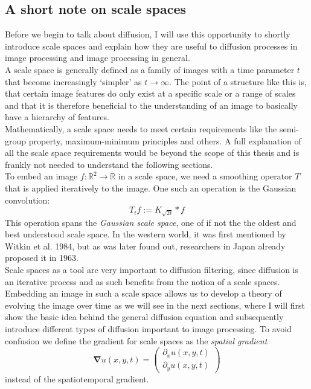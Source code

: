 \subsection{A short note on scale spaces}
Before we begin to talk about diffusion, I will use this opportunity to shortly introduce scale
spaces and explain how they are useful to diffusion processes in image processing and image
processing in general.\\
A scale space is generally defined as a family of images with a time parameter $t$ that become
increasingly `simpler' as $t \to \infty$. The point of a structure like this is, that certain image
features do only exist at a specific scale or a range of scales and that it is therefore beneficial
to the understanding of an image to basically have a hierarchy of features.\\
Mathematically, a scale
space needs to meet certain requirements like the semi-group property, maximum-minimum principles
and others.
A full explanation of all the scale space requirements would be beyond the scope of this thesis
and is frankly not needed to understand the following sections.\\
To embed an image $f:\mathbb{R}^2 \rightarrow \mathbb{R}$ in a scale space, we need a smoothing
operator $T$ that is applied iteratively to the image. One such an operation is the Gaussian
convolution: 
\begin{equation}
    T_tf := K_{\sqrt{2t}} * f
\end{equation}
This operation spans the \textit{Gaussian scale space}, one of if not the the oldest and best
understood scale space. In the western world, it was first mentioned by Witkin et
al.\cite{witkin84} 1984, but as was later found out, researchers in Japan already proposed it in
1963\cite{weickert-ishikawa}.\\
Scale spaces as a tool are very important to diffusion filtering, since diffusion is an iterative
process and as such benefits from the notion of a scale spaces. Embedding an image in such a scale
space allows us to develop a theory of evolving the image over time as we will see in the next
sections, where I will first show the basic idea behind the general diffusion equation and
subsequently introduce different types of diffusion important to image processing.
To avoid confusion we define the gradient for scale spaces as the \textit{spatial gradient} 
\begin{equation}
    \boldsymbol\nabla u(x, y, t) = \begin{pmatrix}
        \partial_x u(x, y, t)\\
        \partial_y u(x, y, t)
    \end{pmatrix} 
\end{equation}
instead of the spatiotemporal gradient.

